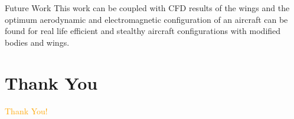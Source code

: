\documentclass{beamer}
\begin{document}
\begin{frame}{Future Work}
This work can be coupled with CFD results of the wings and the optimum aerodynamic and electromagnetic configuration of an aircraft can be found for real life efficient and stealthy aircraft configurations with modified bodies and wings.

\end{frame}
\section*{Thank You}
\begin{frame}
\centering
\Huge{\textcolor{orange}{Thank You!}}
\end{frame}
\end{document}
